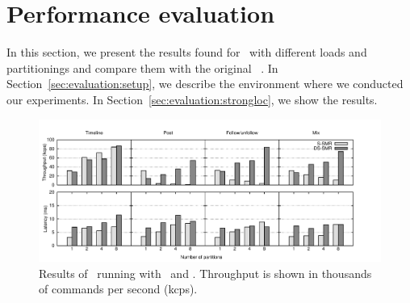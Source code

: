 \section{Performance evaluation}
\label{sec:experiments}



In this section, we present the results found for \appname\ with different loads and partitionings and compare them with the original \ssmr{}~\cite{bezerra2014ssmr}.
In Section~\ref{sec:evaluation:setup}, we describe the environment where we conducted our experiments.
In Section~\ref{sec:evaluation:strongloc}, we show the results.

\begin{figure}
\begin{minipage}[b]{1\linewidth} %
\centering
      \includegraphics[width=1.08\linewidth]{figures/graphs/strong-locality}
\end{minipage}
\caption{Results of \appname\ running with \ssmr\ and \dssmr{}. Throughput is shown in thousands of commands per second (kcps).}
\label{fig:strongloc}
\end{figure}


